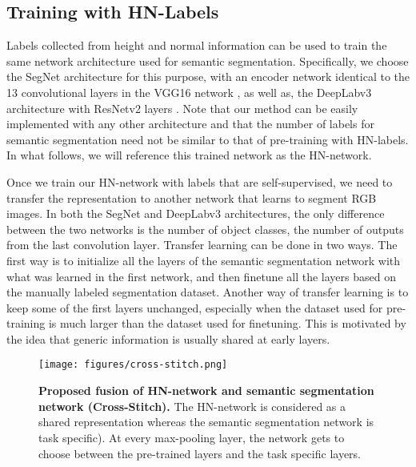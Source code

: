 \subsection{Training with HN-Labels}\label{sec:train_alter}
Labels collected from height and normal information can be used to train the same network architecture used for semantic segmentation. Specifically, we choose the SegNet architecture \cite{badrinarayanan2015segnet} for this purpose, with an encoder network identical to the 13 convolutional layers in the VGG16 network \cite{Simonyan14c}, as well as, the DeepLabv3 architecture \cite{chen2017rethinking} with ResNetv2 layers \cite{he2016identity}. Note that our method can be easily implemented with any other architecture and that the  number of labels for semantic segmentation need not be similar to that of pre-training with HN-labels. In what follows, we will reference this trained network as the HN-network. 



Once we train our HN-network with labels that are self-supervised, we need to transfer the representation to another network that learns to segment RGB images. In both the SegNet and DeepLabv3 architectures, the only difference between the two networks is the number of object classes, \ie  the number of outputs from the last convolution layer. Transfer learning can be done in two ways. The first way is to initialize all the layers of the semantic segmentation network with what was learned in the first network, and then finetune all the layers based on the manually labeled segmentation dataset. Another way of transfer learning is to keep some of the first layers unchanged, especially when the dataset used for pre-training is much larger than the dataset used for finetuning. This is motivated by the idea that  generic information is usually shared at early layers.






















\begin{figure}[t]
\begin{center}
\texttt{[image: figures/cross-stitch.png]}
\end{center}
   \caption{\textbf{Proposed fusion of HN-network and semantic segmentation network (Cross-Stitch).} The HN-network is considered as a shared representation whereas the semantic segmentation network is task specific). At every max-pooling layer, the network gets to choose between the pre-trained layers and the task specific layers.}
\label{fig:cross}
\end{figure}

